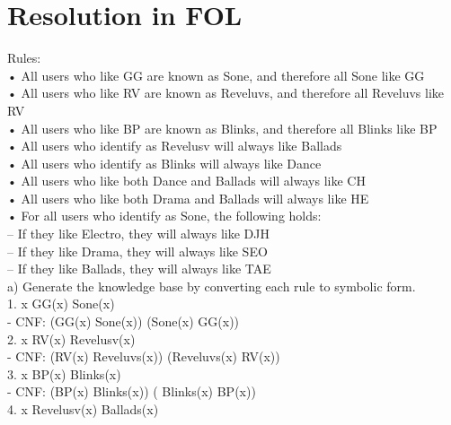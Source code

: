 \documentclass{article}
\begin{document}
\section{Resolution in FOL}

Rules: \\
• All users who like GG are known as Sone, and therefore all Sone like GG\\
• All users who like RV are known as Reveluvs, and therefore all Reveluvs like RV\\
• All users who like BP are known as Blinks, and therefore all Blinks like BP\\
• All users who identify as Revelusv will always like Ballads\\
• All users who identify as Blinks will always like Dance\\
• All users who like both Dance and Ballads will always like CH\\
• All users who like both Drama and Ballads will always like HE\\
• For all users who identify as Sone, the following holds:\\
– If they like Electro, they will always like DJH\\
– If they like Drama, they will always like SEO\\
– If they like Ballads, they will always like TAE\\

a) Generate the knowledge base by converting each rule to symbolic form.\\

1. \forall x \: GG(x) \Leftrightarrow Sone(x)\\

\: \: \: \: - CNF: (\neg GG(x) \vee Sone(x)) \wedge (\neg Sone(x) \vee GG(x))\\

2. \forall x \: RV(x) \Leftrightarrow Revelusv(x)\\

\: \: \: \: - CNF: (\neg RV(x) \vee Reveluvs(x)) \wedge (\neg Reveluvs(x) \vee RV(x))\\

3. \forall x \: BP(x) \Leftrightarrow Blinks(x)\\

\: \: \: \: - CNF: (\neg BP(x) \vee Blinks(x)) \wedge ( \neg Blinks(x) \vee BP(x))\\

4. \forall x \: Revelusv(x) \Rightarrow Ballads(x)\\
\end{document}
